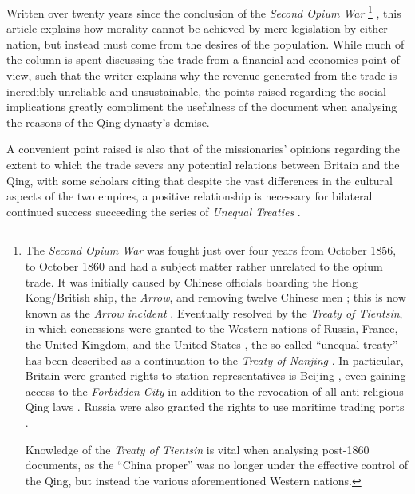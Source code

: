 \documentclass{article}
\begin{document}
Written over twenty years since the conclusion of the \textit{Second Opium War}
\footnote{The \textit{Second Opium War} was fought just over four years from  October 1856, to  October 1860 and had a subject matter rather unrelated to the opium trade. It was initially caused by Chinese officials boarding the Hong Kong/British ship, the \textit{Arrow}, and removing twelve Chinese men
\autocite{Wong:2002}; this is now known as the \textit{Arrow incident}
\autocite{Wong:1974}. Eventually resolved by the \textit{Treaty of Tientsin}, in which concessions were granted to the Western nations of Russia, France, the United Kingdom, and the United States
\autocite{Nield:2015}, the so-called ``unequal treaty'' has been described as a continuation to the \textit{Treaty of Nanjing}
\autocite{Wang:2008}. In particular, Britain were granted rights to station representatives is Beijing
\autocite{HKPress:1912}, even gaining access to the \textit{Forbidden City}
\autocite{Dong:2004} in addition to the revocation of all anti-religious Qing laws
\autocite{Chassiron:1861}. Russia were also granted the rights to use maritime trading ports
\autocite{Adamov:1952}.

Knowledge of the \textit{Treaty of Tientsin} is vital when analysing post-1860 documents, as the ``China proper'' was no longer under the effective control of the Qing, but instead the various aforementioned Western nations.}
, this article explains how morality cannot be achieved by mere legislation by either nation, but instead must come from the desires of the population. While much of the column is spent discussing the trade from a financial and economics point-of-view, such that the writer explains why the revenue generated from the trade is incredibly unreliable and unsustainable, the points raised regarding the social implications greatly compliment the usefulness of the document when analysing the reasons of the Qing dynasty's demise.

A convenient point raised is also that of the missionaries' opinions regarding the extent to which the trade severs any potential relations between Britain and the Qing, with some scholars citing that despite the vast differences in the cultural aspects of the two empires, a positive relationship is necessary for bilateral continued success succeeding the series of \textit{Unequal Treaties}
\autocite{Fairbank:1942}.

\pagebreak
\printbibliography[title={Cited Works}, heading=bibintoc]
\end{document}
